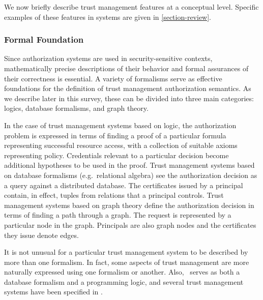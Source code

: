 We now briefly describe trust management features at a conceptual
level.  Specific examples of these features in systems are given in
\autoref{section-review}.

\subsubsection{Formal Foundation} 
Since authorization systems are used in security-sensitive contexts,
mathematically precise descriptions of their behavior and formal
assurances of their correctness is essential.  A variety of formalisms
serve as effective foundations for the definition of trust management
authorization semantics.  As we describe later in this survey, these
can be divided into three main categories: logics, database
formalisms, and graph theory.

In the case of trust management systems based on logic, the
authorization problem is expressed in terms of finding a proof of a
particular formula representing successful resource access, with a
collection of suitable axioms representing policy.  Credentials
relevant to a particular decision become additional hypotheses to be
used in the proof.  Trust management systems based on database
formalisms (e.g.~relational algebra) see the authorization decision as
a query against a distributed database. The certificates issued by a
principal contain, in effect, tuples from relations that a principal
controls.  Trust management systems based on graph theory define the
authorization decision in terms of finding a path through a graph. The
request is represented by a particular node in the graph. Principals
are also graph nodes and the certificates they issue denote edges.


It is not unusual for a particular trust management system to be
described by more than one formalism. In fact, some aspects of trust
management are more naturally expressed using one formalism or
another.  Also, \datalog\ serves as both a database formalism and a
programming logic, and several trust management systems have been
specified in \datalog.



